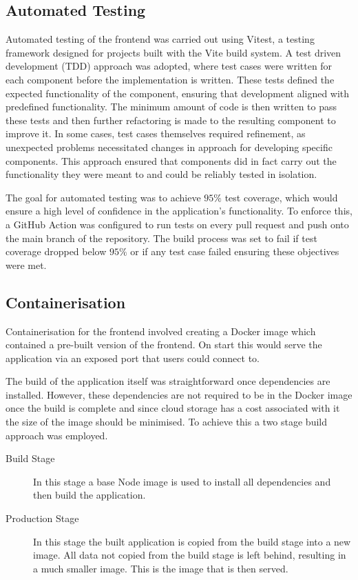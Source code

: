 \subsection{Automated Testing}
Automated testing of the frontend was carried out using Vitest, a testing framework designed for projects built with the Vite build system. A test driven development (TDD) approach was adopted, where test cases were written for each component before the implementation is written. These tests defined the expected functionality of the component, ensuring that development aligned with predefined functionality. The minimum amount of code is then written to pass these tests and then further refactoring is made to the resulting component to improve it. In some cases, test cases themselves required refinement, as unexpected problems necessitated changes in approach for developing specific components. This approach ensured that components did in fact carry out the functionality they were meant to and could be reliably tested in isolation.

The goal for automated testing was to achieve $95\%$ test coverage, which would ensure a high level of confidence in the application's functionality. To enforce this, a GitHub Action was configured to run tests on every pull request and push onto the main branch of the repository. The build process was set to fail if test coverage dropped below $95\%$ or if any test case failed ensuring these objectives were met.

\subsection{Containerisation}
Containerisation for the frontend involved creating a Docker image which contained a pre-built version of the frontend. On start this would serve the application via an exposed port that users could connect to.

The build of the application itself was straightforward once dependencies are installed. However, these dependencies are not required to be in the Docker image once the build is complete and since cloud storage has a cost associated with it the size of the image should be minimised. To achieve this a two stage build approach was employed.

\begin{description}
    \item[Build Stage] In this stage a base Node image is used to install all dependencies and then build the application.
    \item[Production Stage] In this stage the built application is copied from the build stage into a new image. All data not copied from the build stage is left behind, resulting in a much smaller image. This is the image that is then served.
\end{description}

